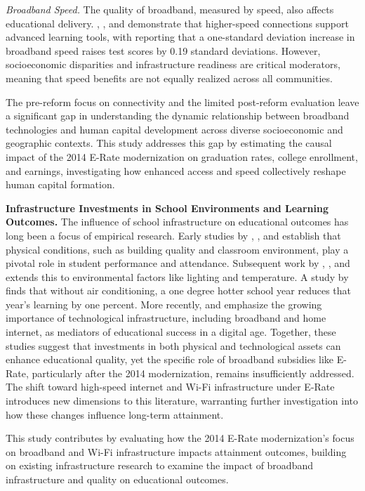 \textit{Broadband Speed.} The quality of broadband, measured by speed, also affects educational delivery. \citet{boeri2023}, \citet{grimes2018}, and \citet{sanchis2021} demonstrate that higher-speed connections support advanced learning tools, with \citet{sanchis2021} reporting that a one-standard deviation increase in broadband speed raises test scores by 0.19 standard deviations. However, socioeconomic disparities and infrastructure readiness are critical moderators, meaning that speed benefits are not equally realized across all communities.

The pre-reform focus on connectivity \citep{hazlett2019} and the limited post-reform evaluation leave a significant gap in understanding the dynamic relationship between broadband technologies and human capital development across diverse socioeconomic and geographic contexts. This study addresses this gap by estimating the causal impact of the 2014 E-Rate modernization on graduation rates, college enrollment, and earnings, investigating how enhanced access and speed collectively reshape human capital formation. 

\textbf{Infrastructure Investments in School Environments and Learning Outcomes.}  The influence of school infrastructure on educational outcomes has long been a focus of empirical research. Early studies by \citet{berner1993}, \citet{cash1993}, and \citet{duran2008} establish that physical conditions, such as building quality and classroom environment, play a pivotal role in student performance and attendance. Subsequent work by \citet{maxwell1999}, \citet{hathaway1995}, and \citet{park2020} extends this to environmental factors like lighting and temperature. A study by \citet{park2020} finds that without air conditioning, a one degree hotter school year reduces that year’s learning by one percent. More recently, \citet{wanke2024} and \citet{daoud2021} emphasize the growing importance of technological infrastructure, including broadband and home internet, as mediators of educational success in a digital age. Together, these studies suggest that investments in both physical and technological assets can enhance educational quality, yet the specific role of broadband subsidies like E-Rate, particularly after the 2014 modernization, remains insufficiently addressed. The shift toward high-speed internet and Wi-Fi infrastructure under E-Rate introduces new dimensions to this literature, warranting further investigation into how these changes influence long-term attainment.

This study contributes by evaluating how the 2014 E-Rate modernization’s focus on broadband and Wi-Fi infrastructure impacts attainment outcomes, building on existing infrastructure research to examine the impact of broadband infrastructure and quality on educational outcomes.

